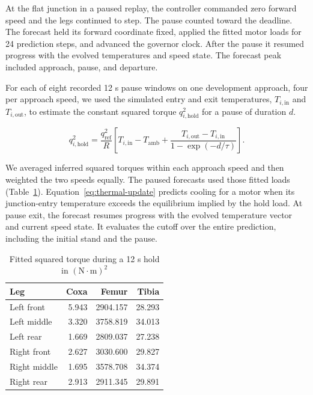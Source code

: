 \documentclass{ieeeaccess}
\begin{document}
At the flat junction in a paused replay, the controller commanded zero forward speed and the legs continued to step. The pause counted toward the deadline. The forecast held its forward coordinate fixed, applied the fitted motor loads for 24 prediction steps, and advanced the governor clock. After the pause it resumed progress with the evolved temperatures and speed state. The forecast peak included approach, pause, and departure.

For each of eight recorded 12 s pause windows on one development approach, four per approach speed, we used the simulated entry and exit temperatures, $T_{i,\mathrm{in}}$ and $T_{i,\mathrm{out}}$, to estimate the constant squared torque $q_{i,\mathrm{hold}}^2$ for a pause of duration $d$.

\begin{equation}
q_{i,\mathrm{hold}}^2 =
\frac{q_{\mathrm{ref}}^2}{R}
\left[T_{i,\mathrm{in}}-T_{\mathrm{amb}}+
\frac{T_{i,\mathrm{out}}-T_{i,\mathrm{in}}}{1-\exp(-d/\tau)}\right].
\end{equation}

We averaged inferred squared torques within each approach speed and then weighted the two speeds equally. The paused forecasts used those fitted loads (Table~\ref{tab:hold-loads}). Equation~\eqref{eq:thermal-update} predicts cooling for a motor when its junction-entry temperature exceeds the equilibrium implied by the hold load. At pause exit, the forecast resumes progress with the evolved temperature vector and current speed state. It evaluates the cutoff over the entire prediction, including the initial stand and the pause.

\begin{table}[!t]
\caption{Fitted squared torque during a 12 s hold in $(\mathrm{N}{\cdot}\mathrm{m})^2$}
\label{tab:hold-loads}
\centering
\footnotesize
\renewcommand{\arraystretch}{1.12}
\begin{tabular}{@{}lrrr@{}}
\hline
Leg & Coxa & Femur & Tibia \\
\hline
Left front & 5.943 & 2904.157 & 28.293 \\
Left middle & 3.320 & 3758.819 & 34.013 \\
Left rear & 1.669 & 2809.037 & 27.238 \\
Right front & 2.627 & 3030.600 & 29.827 \\
Right middle & 1.695 & 3578.708 & 34.374 \\
Right rear & 2.913 & 2911.345 & 29.891 \\
\hline
\end{tabular}
\end{table}
\end{document}

